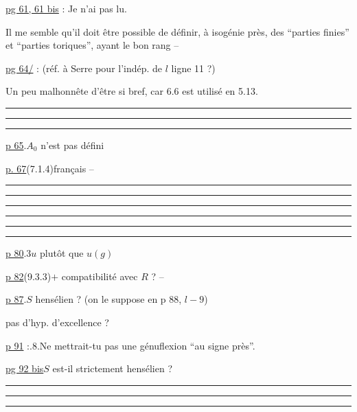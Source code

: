 \uline{pg 61, 61 bis} : Je n'ai pas lu.

Il me semble qu'il doit être possible de définir, à isogénie près, des ``parties finies'' et ``parties toriques'', ayant le bon rang --


\uline{pg 64/} :  (réf. à Serre pour l'indép. de $l$ ligne 11 ?)

Un peu malhonnête d'être si bref, car 6.6 est utilisé en 5.13.


\hrule\smallskip\hrule\smallskip\hrule

\quad \uline{p 65}.\qquad $A_0$ n'est pas défini\qquad {}

\uline{p. 67}\qquad (7.1.4)\qquad français --

\hrule\smallskip\hrule\smallskip\hrule


\hrule\smallskip\hrule\smallskip\hrule

\quad \uline{p 80}.3\qquad $u$ plutôt que $u(g)$

\uline{p 82}\qquad (9.3.3)\qquad $+$ compatibilité avec $R$ ? --

\uline{p 87}.\qquad $S$  hensélien ? (on le suppose en p 88, $l-9$)

pas d'hyp. d'excellence ?

\uline{p 91} :.8.\qquad Ne mettrait-tu pas une génuflexion ``au signe près''.

\uline{pg 92 bis}\qquad $S$ est-il strictement hensélien ?

\hrule\smallskip\hrule\smallskip\hrule


